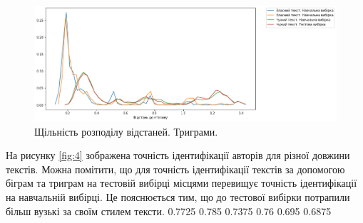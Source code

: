 \documentclass[12pt, a4paper]{extarticle}
\begin{document}
\begin{figure}
\includegraphics[width=\linewidth]{figures/3.png}
\centering
\caption{Щільність розподілу відстаней. Триграми.}
\label{fig:3}
\end{figure}
На рисунку \ref{fig:4} зображена точність ідентифікації авторів для різної довжини текстів. Можна помітити, що для точність ідентифікації текстів за допомогою біграм та триграм на тестовій вибірці місцями перевищує точність ідентифікації на навчальній вибірці. Це пояснюється тим, що до тестової вибірки потрапили більш вузькі за своїм стилем тексти.
0.7725 0.785 0.7375 0.76 0.695 0.6875
\end{document}
